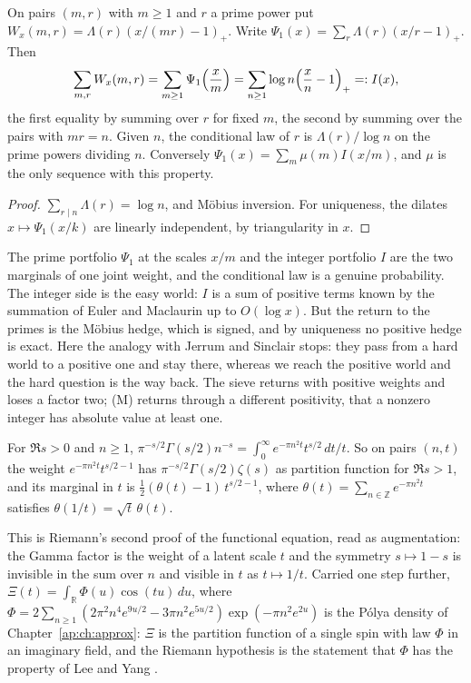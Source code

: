 \begin{proposition}\label{lvz:prop:two}
On pairs $(m,r)$ with $m\ge1$ and $r$ a prime power put $W_x(m,r)=\Lambda(r)(x/(mr)-1)_+$. Write $\Psi_1(x)=\sum_r\Lambda(r)(x/r-1)_+$. Then
\[
\sum_{m,r}W_x(m,r)=\sum_{m\ge1}\Psi_1\Bigl(\frac xm\Bigr)=\sum_{n\ge1}\log n\Bigl(\frac xn-1\Bigr)_+=:I(x),
\]
the first equality by summing over $r$ for fixed $m$, the second by summing over the pairs with $mr=n$. Given $n$, the conditional law of $r$ is $\Lambda(r)/\log n$ on the prime powers dividing $n$. Conversely $\Psi_1(x)=\sum_m\mu(m)I(x/m)$, and $\mu$ is the only sequence with this property.
\end{proposition}

\begin{proof}
$\sum_{r\mid n}\Lambda(r)=\log n$, and M\"obius inversion. For uniqueness, the dilates $x\mapsto\Psi_1(x/k)$ are linearly independent, by triangularity in $x$.
\end{proof}

The prime portfolio $\Psi_1$ at the scales $x/m$ and the integer portfolio $I$ are the two marginals of one joint weight, and the conditional law is a genuine probability. The integer side is the easy world: $I$ is a sum of positive terms known by the summation of Euler and Maclaurin up to $O(\log x)$. But the return to the primes is the M\"obius hedge, which is signed, and by uniqueness no positive hedge is exact. Here the analogy with Jerrum and Sinclair stops: they pass from a hard world to a positive one and stay there, whereas we reach the positive world and the hard question is the way back. The sieve returns with positive weights and loses a factor two; (M) returns through a different positivity, that a nonzero integer has absolute value at least one.

\begin{proposition}\label{lvz:prop:theta}
For $\Re s>0$ and $n\ge1$, $\pi^{-s/2}\Gamma(s/2)n^{-s}=\int_0^\infty e^{-\pi n^2t}t^{s/2}\,dt/t$. So on pairs $(n,t)$ the weight $e^{-\pi n^2t}t^{s/2-1}$ has $\pi^{-s/2}\Gamma(s/2)\zeta(s)$ as partition function for $\Re s>1$, and its marginal in $t$ is $\frac12(\theta(t)-1)\,t^{s/2-1}$, where $\theta(t)=\sum_{n\in\mathbb Z}e^{-\pi n^2t}$ satisfies $\theta(1/t)=\sqrt t\,\theta(t)$.
\end{proposition}

This is Riemann's second proof of the functional equation, read as augmentation: the Gamma factor is the weight of a latent scale $t$ and the symmetry $s\mapsto1-s$ is invisible in the sum over $n$ and visible in $t$ as $t\mapsto1/t$. Carried one step further, $\Xi(t)=\int_{\mathbb R}\Phi(u)\cos(tu)\,du$, where $\Phi=2\sum_{n\ge1}(2\pi^2n^4e^{9u/2}-3\pi n^2e^{5u/2})\exp(-\pi n^2e^{2u})$ is the P\'olya density of Chapter~\ref{ap:ch:approx}: $\Xi$ is the partition function of a single spin with law $\Phi$ in an imaginary field, and the Riemann hypothesis is the statement that $\Phi$ has the property of Lee and Yang \cite{LeeYang}.

